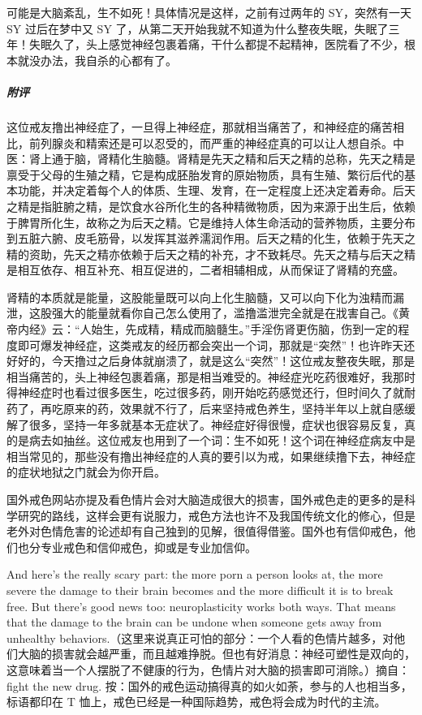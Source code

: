 \begin{case}
    可能是大脑紊乱，生不如死！具体情况是这样，之前有过两年的 SY，突然有一天 SY 过后在梦中又 SY 了，从第二天开始我就不知道为什么整夜失眠，失眠了三年！失眠久了，头上感觉神经包裹着痛，干什么都提不起精神，医院看了不少，根本就没办法，我自杀的心都有了。
    \subparagraph{附评} 这位戒友撸出神经症了，一旦得上神经症，那就相当痛苦了，和神经症的痛苦相比，前列腺炎和精索还是可以忍受的，而严重的神经症真的可以让人想自杀。中医：肾上通于脑，肾精化生脑髓。肾精是先天之精和后天之精的总称，先天之精是禀受于父母的生殖之精，它是构成胚胎发育的原始物质，具有生殖、繁衍后代的基本功能，并决定着每个人的体质、生理、发育，在一定程度上还决定着寿命。后天之精是指脏腑之精，是饮食水谷所化生的各种精微物质，因为来源于出生后，依赖于脾胃所化生，故称之为后天之精。它是维持人体生命活动的营养物质，主要分布到五脏六腑、皮毛筋骨，以发挥其滋养濡润作用。后天之精的化生，依赖于先天之精的资助，先天之精亦依赖于后天之精的补充，才不致耗尽。先天之精与后天之精是相互依存、相互补充、相互促进的，二者相辅相成，从而保证了肾精的充盛。

    肾精的本质就是能量，这股能量既可以向上化生脑髓，又可以向下化为浊精而漏泄，这股强大的能量就看你自己怎么使用了，滥撸滥泄完全就是在戕害自己。《黄帝内经》云：“人始生，先成精，精成而脑髓生。”手淫伤肾更伤脑，伤到一定的程度即可爆发神经症，这类戒友的经历都会突出一个词，那就是“突然”！也许昨天还好好的，今天撸过之后身体就崩溃了，就是这么“突然”！这位戒友整夜失眠，那是相当痛苦的，头上神经包裹着痛，那是相当难受的。神经症光吃药很难好，我那时得神经症时也看过很多医生，吃过很多药，刚开始吃药感觉还行，但时间久了就耐药了，再吃原来的药，效果就不行了，后来坚持戒色养生，坚持半年以上就自感缓解了很多，坚持一年多就基本无症状了。神经症好得很慢，症状也很容易反复，真的是病去如抽丝。这位戒友也用到了一个词：生不如死！这个词在神经症病友中是相当常见的，那些没有撸出神经症的人真的要引以为戒，如果继续撸下去，神经症的症状地狱之门就会为你开启。

    国外戒色网站亦提及看色情片会对大脑造成很大的损害，国外戒色走的更多的是科学研究的路线，这样会更有说服力，戒色方法也许不及我国传统文化的修心，但是老外对色情危害的论述却有自己独到的见解，很值得借鉴。国外也有信仰戒色，他们也分专业戒色和信仰戒色，抑或是专业加信仰。

    And here’s the really scary part: the more porn a person looks at, the more severe the damage to their brain becomes and the more difficult it is to break free. But there’s good news too: neuroplasticity works both ways. That means that the damage to the brain can be undone when someone gets away from unhealthy behaviors.（这里来说真正可怕的部分：一个人看的色情片越多，对他们大脑的损害就会越严重，而且越难挣脱。但也有好消息：神经可塑性是双向的，这意味着当一个人摆脱了不健康的行为，色情片对大脑的损害即可消除。）摘自：fight the new drug. 按：国外的戒色运动搞得真的如火如荼，参与的人也相当多，标语都印在 T 恤上，戒色已经是一种国际趋势，戒色将会成为时代的主流。
\end{case}

